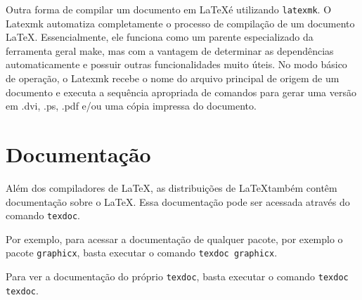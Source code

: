 


Outra forma de compilar um documento em \LaTeX é utilizando \texttt{latexmk}. O Latexmk automatiza completamente o processo de compilação de um documento LaTeX. Essencialmente, ele funciona como um parente especializado da ferramenta geral make, mas com a vantagem de determinar as dependências automaticamente e possuir outras funcionalidades muito úteis. No modo básico de operação, o Latexmk recebe o nome do arquivo principal de origem de um documento e executa a sequência apropriada de comandos para gerar uma versão em .dvi, .ps, .pdf e/ou uma cópia impressa do documento.


\section{Documentação}

Além dos compiladores de \LaTeX, as distribuições de \LaTeX também contêm documentação sobre o \LaTeX. Essa documentação pode ser acessada através do comando \texttt{texdoc}.

Por exemplo, para acessar a documentação de qualquer pacote, por exemplo o pacote \texttt{graphicx}, basta executar o comando \texttt{texdoc graphicx}.

Para ver a documentação do próprio \texttt{texdoc}, basta executar o comando \texttt{texdoc texdoc}.

